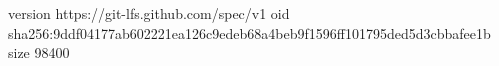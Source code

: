 version https://git-lfs.github.com/spec/v1
oid sha256:9ddf04177ab602221ea126c9edeb68a4beb9f1596ff101795ded5d3cbbafee1b
size 98400
